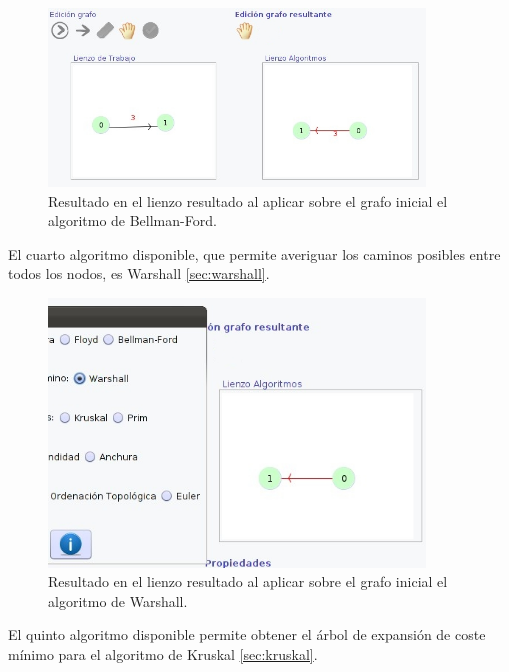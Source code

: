 \begin{figure}[H]
\begin{center}
\includegraphics[width=10cm]{./imagenes_documentacion/imagen_resultado_bellman_ford_vertice_0.jpeg}
\caption{Resultado en el lienzo resultado al aplicar sobre el grafo inicial el algoritmo de Bellman-Ford.}
\end{center}
\end{figure}
\newpage
El cuarto algoritmo disponible, que permite averiguar los caminos posibles entre todos los nodos, es Warshall \ref{sec:warshall}.

\begin{figure}[H]
\begin{center}
\includegraphics[width=10cm]{./imagenes_documentacion/imagen_warshall_y_resultado.jpeg}
\caption{Resultado en el lienzo resultado al aplicar sobre el grafo inicial el algoritmo de Warshall.}
\end{center}
\end{figure}

El quinto algoritmo disponible permite obtener el árbol de expansión de coste mínimo para el algoritmo de Kruskal \ref{sec:kruskal}.

